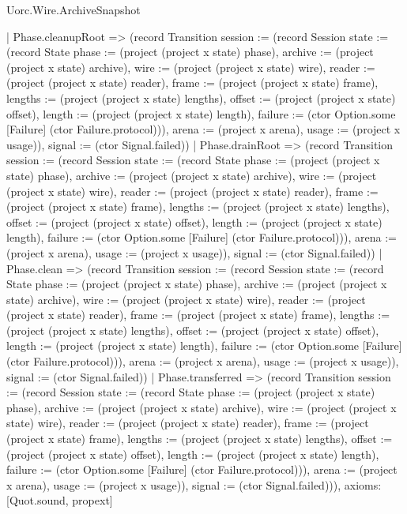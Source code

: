 \begin{lexlean}{Uorc.Wire.ArchiveSnapshot}
\begin{semanticmodule}
{    | Phase.cleanupRoot => (record Transition {session := (record Session {state := (record State {phase := (project (project x state) phase), archive := (project (project x state) archive), wire := (project (project x state) wire), reader := (project (project x state) reader), frame := (project (project x state) frame), lengths := (project (project x state) lengths), offset := (project (project x state) offset), length := (project (project x state) length), failure := (ctor Option.some [Failure] (ctor Failure.protocol))}), arena := (project x arena), usage := (project x usage)}), signal := (ctor Signal.failed)})
    | Phase.drainRoot => (record Transition {session := (record Session {state := (record State {phase := (project (project x state) phase), archive := (project (project x state) archive), wire := (project (project x state) wire), reader := (project (project x state) reader), frame := (project (project x state) frame), lengths := (project (project x state) lengths), offset := (project (project x state) offset), length := (project (project x state) length), failure := (ctor Option.some [Failure] (ctor Failure.protocol))}), arena := (project x arena), usage := (project x usage)}), signal := (ctor Signal.failed)})
    | Phase.clean => (record Transition {session := (record Session {state := (record State {phase := (project (project x state) phase), archive := (project (project x state) archive), wire := (project (project x state) wire), reader := (project (project x state) reader), frame := (project (project x state) frame), lengths := (project (project x state) lengths), offset := (project (project x state) offset), length := (project (project x state) length), failure := (ctor Option.some [Failure] (ctor Failure.protocol))}), arena := (project x arena), usage := (project x usage)}), signal := (ctor Signal.failed)})
    | Phase.transferred => (record Transition {session := (record Session {state := (record State {phase := (project (project x state) phase), archive := (project (project x state) archive), wire := (project (project x state) wire), reader := (project (project x state) reader), frame := (project (project x state) frame), lengths := (project (project x state) lengths), offset := (project (project x state) offset), length := (project (project x state) length), failure := (ctor Option.some [Failure] (ctor Failure.protocol))}), arena := (project x arena), usage := (project x usage)}), signal := (ctor Signal.failed)})),
  axioms: [Quot.sound, propext]
}


\end{semanticmodule}
\end{lexlean}
